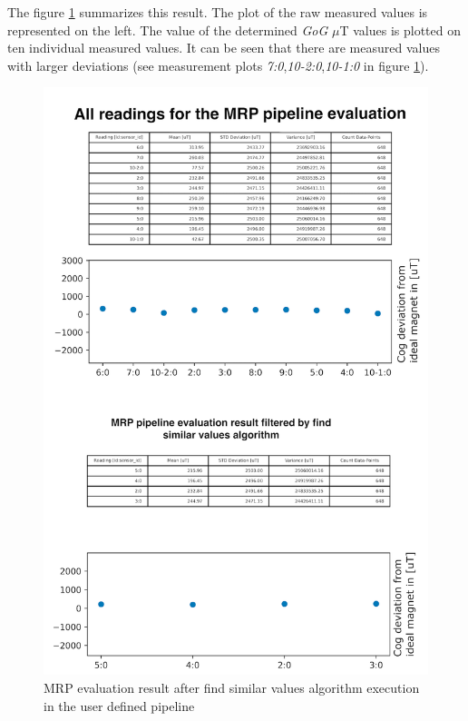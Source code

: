 The figure
\ref{MRP_evaluation_result_after_find_similar_values_algorithm_execution_in_the_user_defined_pipeline.png}
summarizes this result. The plot of the raw measured values is
represented on the left. The value of the determined \emph{GoG} \(\mu\)T
values is plotted on ten individual measured values. It can be seen that
there are measured values with larger deviations (see measurement plots
\emph{7:0},\emph{10-2:0},\emph{10-1:0} in figure
\ref{MRP_evaluation_result_after_find_similar_values_algorithm_execution_in_the_user_defined_pipeline.png}).

\begin{figure}
\centering
\includegraphics{./generated_images/border_MRP_evaluation_result_after_find_similar_values_algorithm_execution_in_the_user_defined_pipeline.png}
\caption{MRP evaluation result after find similar values algorithm
execution in the user defined pipeline
\label{MRP_evaluation_result_after_find_similar_values_algorithm_execution_in_the_user_defined_pipeline.png}}
\end{figure}

